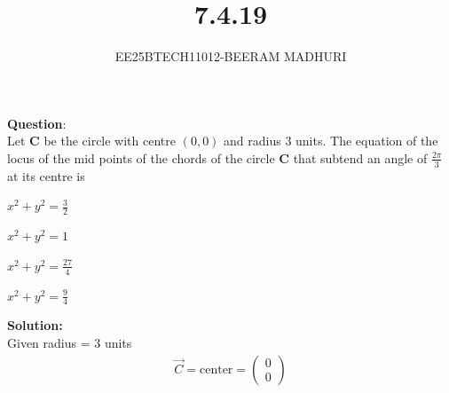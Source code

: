 \documentclass[journal]{IEEEtran}
\begin{document}

\vspace{3cm}

\title{7.4.19}
\author{EE25BTECH11012-BEERAM MADHURI}
{\let\newpage\relax\maketitle}

\renewcommand{\thefigure}{\theenumi}
\renewcommand{\thetable}{\theenumi}
\setlength{\intextsep}{10pt} %


\renewcommand{\thetable}{\theenumi}


\textbf{Question}:\\
Let $\mathbf{C}$ be the circle with centre $(0,0)$ and radius $3$ units. The equation of the locus of the mid points of the chords of the circle $\mathbf{C}$ that subtend an angle of $\frac{2\pi}{3}$ at its centre is

\begin{enumerate}
\begin{multicols}{4}
    \item $x^2 + y^2 = \frac{3}{2}$
    \item $x^2 + y^2 = 1$
    \item $x^2 + y^2 = \frac{27}{4}$
    \item $x^2 + y^2 = \frac{9}{4}$
\end{multicols}    
\end{enumerate}

\textbf{Solution:}\\
Given radius = $3$ units
\begin{align}
\vec{C} = \text{center} = \begin{pmatrix} 0 \\ 0 \end{pmatrix}
\end{align}
\end{document}
